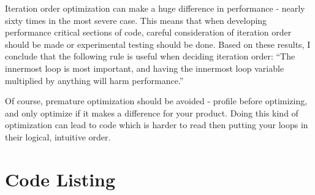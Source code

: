 \documentclass[12pt,letterpaper]{article}
\begin{document}
Iteration order optimization can make a huge difference in performance - nearly sixty times in the
most severe case. This means that when developing performance critical sections of code, careful
consideration of iteration order should be made or experimental testing should be done.  Based on
these results, I conclude that the following rule is useful when deciding iteration order: ``The
innermost loop is most important, and having the innermost loop variable multiplied by anything will
harm performance.'' 

Of course, premature optimization should be avoided - profile before optimizing, and only optimize
if it makes a difference for your product. Doing this kind of optimization can lead to code which is
harder to read then putting your loops in their logical, intuitive order.


\section*{Code Listing}


\end{document}

